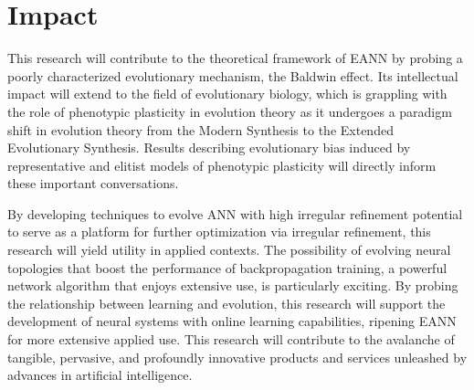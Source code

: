\section{Impact}

This research will contribute to the theoretical framework of EANN by probing a poorly characterized evolutionary mechanism, the Baldwin effect.
Its intellectual impact will extend to the field of evolutionary biology, which is grappling with the role of phenotypic plasticity in evolution theory as it undergoes a paradigm shift in evolution theory from the Modern Synthesis to the Extended Evolutionary Synthesis.\autocite{Pigliucci2008IsEvolvable}
Results describing evolutionary bias induced by representative and elitist models of phenotypic plasticity will directly inform these important conversations.

By developing techniques to evolve ANN with high irregular refinement potential to serve as a platform for further optimization via irregular refinement, this research will yield utility in applied contexts.
The possibility of evolving neural topologies that boost the performance of backpropagation training, a powerful network algorithm that enjoys extensive use, is particularly exciting.
By probing the relationship between learning and evolution, this research will support the development of neural systems with online learning capabilities, ripening EANN for more extensive applied use.
This research will contribute to the avalanche of tangible, pervasive, and profoundly innovative products and services unleashed by advances in artificial intelligence.
